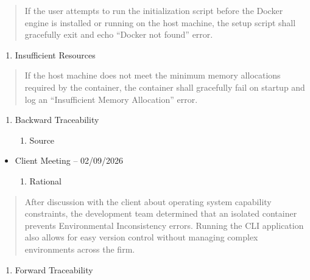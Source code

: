 \documentclass[
]{article}
\begin{document}
\begin{quote}
If the user attempts to run the initialization script before the Docker
engine is installed or running on the host machine, the setup script
shall gracefully exit and echo ``Docker not found'' error.
\end{quote}

\begin{enumerate}
\def\labelenumi{\roman{enumi}.}
\setcounter{enumi}{1}
\item
  Insufficient Resources
\end{enumerate}

\begin{quote}
If the host machine does not meet the minimum memory allocations
required by the container, the container shall gracefully fail on
startup and log an ``Insufficient Memory Allocation'' error.
\end{quote}

\begin{enumerate}
\def\labelenumi{\alph{enumi}.}
\setcounter{enumi}{1}
\item
  Backward Traceability

  \begin{enumerate}
  \def\labelenumii{\roman{enumii}.}
  \item
    Source
  \end{enumerate}
\end{enumerate}

\begin{itemize}
\item
  Client Meeting -- 02/09/2026

  \begin{enumerate}
  \def\labelenumi{\roman{enumi}.}
  \item
    Rational
  \end{enumerate}
\end{itemize}

\begin{quote}
After discussion with the client about operating system capability
constraints, the development team determined that an isolated container
prevents Environmental Inconsistency errors. Running the CLI application
also allows for easy version control without managing complex
environments across the firm.
\end{quote}

\begin{enumerate}
\def\labelenumi{\alph{enumi}.}
\item
  Forward Traceability
\end{enumerate}
\end{document}
